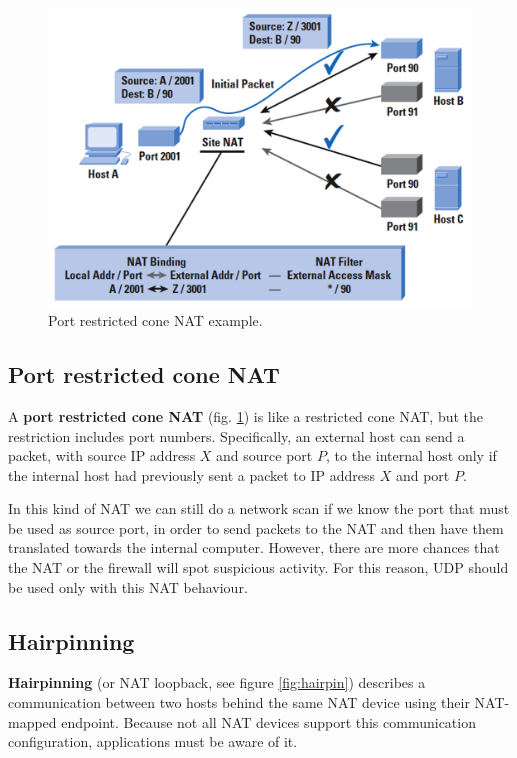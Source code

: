 \begin{figure}[H]
    \centering
    \includegraphics[scale=0.13]{img/port_restr_cone_nat.png}
    \decoRule
    \caption{Port restricted cone NAT example.}
    \label{fig:port_restr_cone_nat}
\end{figure}

\subsection{Port restricted cone NAT}
A \textbf{port restricted cone NAT} (fig. \ref{fig:port_restr_cone_nat}) is like a restricted cone NAT, but the restriction includes port numbers. Specifically, an external host can send a packet, with source IP address $X$ and source port $P$, to the internal host only if the internal host had previously sent a packet to IP address $X$ and port $P$.

In this kind of NAT we can still do a network scan if we know the port that must be used as source port, in order to send packets to the NAT and then have them translated towards the internal computer. However, there are more chances that the NAT or the firewall will spot suspicious activity. For this reason, UDP should be used only with this NAT behaviour.

\subsection{Hairpinning}
\textbf{Hairpinning} (or NAT loopback, see figure \ref{fig:hairpin}) describes a communication between two hosts behind the same NAT device using their NAT-mapped endpoint. Because not all NAT devices support this communication configuration, applications must be aware of it.

